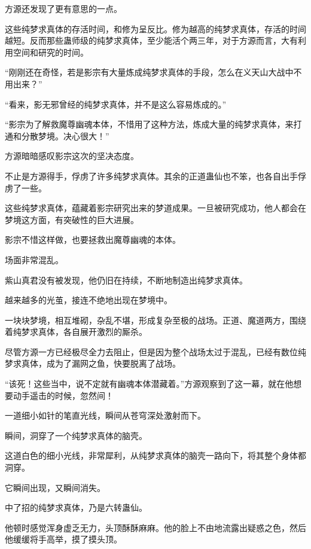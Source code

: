 
\begin{this_body}



方源还发现了更有意思的一点。

这些纯梦求真体的存活时间，和修为呈反比。修为越高的纯梦求真体，存活的时间越短。反而那些蛊师级的纯梦求真体，至少能活个两三年，对于方源而言，大有利用空间和研究的时间。

“刚刚还在奇怪，若是影宗有大量炼成纯梦求真体的手段，怎么在义天山大战中不用出来？”

“看来，影无邪曾经的纯梦求真体，并不是这么容易炼成的。”

“影宗为了解救魔尊幽魂本体，不惜用了这种方法，炼成大量的纯梦求真体，来打通和分散梦境。决心很大！”

方源暗暗感叹影宗这次的坚决态度。

不止是方源得手，俘虏了许多纯梦求真体。其余的正道蛊仙也不笨，也各自出手俘虏了一些。

这些纯梦求真体，蕴藏着影宗研究出来的梦道成果。一旦被研究成功，他人都会在梦境这方面，有突破性的巨大进展。

影宗不惜这样做，也要拯救出魔尊幽魂的本体。

场面非常混乱。

紫山真君没有被发现，他仍旧在持续，不断地制造出纯梦求真体。

越来越多的光茧，接连不绝地出现在梦境中。

一块块梦境，相互堆砌，杂乱不堪，形成复杂至极的战场。正道、魔道两方，围绕着纯梦求真体，各自展开激烈的厮杀。

尽管方源一方已经极尽全力去阻止，但是因为整个战场太过于混乱，已经有数位纯梦求真体，成为了漏网之鱼，快要脱离了战场。

“该死！这些当中，说不定就有幽魂本体潜藏着。”方源观察到了这一幕，就在他想要动手遥击的时候，忽然间！

一道细小如针的笔直光线，瞬间从苍穹深处激射而下。

瞬间，洞穿了一个纯梦求真体的脑壳。

这道白色的细小光线，非常犀利，从纯梦求真体的脑壳一路向下，将其整个身体都洞穿。

它瞬间出现，又瞬间消失。

中了招的纯梦求真体，乃是六转蛊仙。

他顿时感觉浑身虚乏无力，头顶酥酥麻麻。他的脸上不由地流露出疑惑之色，然后他缓缓将手高举，摸了摸头顶。


\end{this_body}
